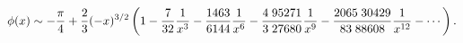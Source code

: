 \[\mathop{\phi\/}\nolimits\!\left(x\right)\sim-\frac{\pi}{4}+\frac{2}{3}(-x)^{3/%
2}\left(1-\frac{7}{32}\frac{1}{x^{3}}-\frac{1463}{6144}\frac{1}{x^{6}}-\frac{4%
\;95271}{3\;27680}\frac{1}{x^{9}}-\frac{2065\;30429}{83\;88608}\frac{1}{x^{12}%
}-\cdots\right).\]